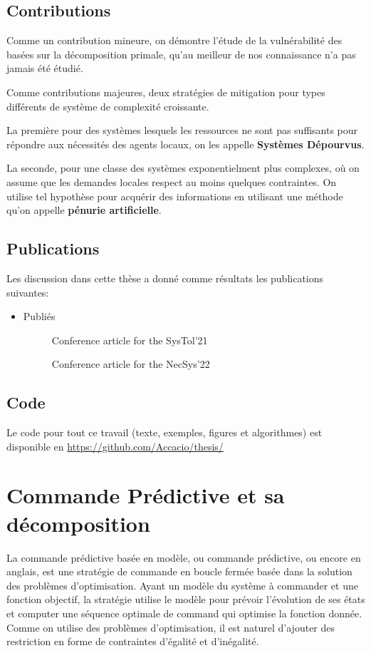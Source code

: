 \documentclass[../main.tex]{subfiles}
\begin{document}
\subsection{Contributions}
Comme un contribution mineure, on démontre l'étude de la vulnérabilité des \dmpc{} basées sur la décomposition primale, qu'au meilleur de nos connaissance n'a pas jamais été étudié.

Comme contributions majeures, deux stratégies de mitigation pour types différents de système de complexité croissante.

La première pour des systèmes lesquels les ressources ne sont pas suffisants pour répondre aux nécessités des agents locaux, on les appelle \textbf{Systèmes Dépourvus}.

La seconde, pour une classe des systèmes exponentielment plus complexes, où on assume que les demandes locales respect au moins quelques contraintes. On utilise tel hypothèse pour acquérir des informations en utilisant une méthode qu'on appelle \textbf{pénurie artificielle}.

\subsection{Publications}
Les discussion dans cette thèse a donné comme résultats les publications suivantes:
\begin{itemize}
  \item Publiés
        \begin{description}
          \item[\cite{NogueiraEtAl2021}] Conference article for the SysTol'21
          \item[\cite{NogueiraEtAl2022}] Conference article for the NecSys'22
        \end{description}
\end{itemize}

\subsection{Code}
Le code pour tout ce travail (texte, exemples, figures et algorithmes) est disponible en \url{https://github.com/Accacio/thesis/}

\newpage
\section{Commande Prédictive et sa décomposition}\label{sec:comm-pred-et}

La commande prédictive basée en modèle, ou commande prédictive, ou encore \mpclong{} en anglais, est une stratégie de commande en boucle fermée basée dans la solution des problèmes d'optimisation.
Ayant un modèle du système à commander et une fonction objectif, la stratégie utilise le modèle pour prévoir l'évolution de ses états et computer une séquence optimale de command qui optimise la fonction donnée.
Comme on utilise des problèmes d'optimisation, il est naturel d'ajouter des restriction en forme de contraintes d'égalité et d'inégalité.
\end{document}
